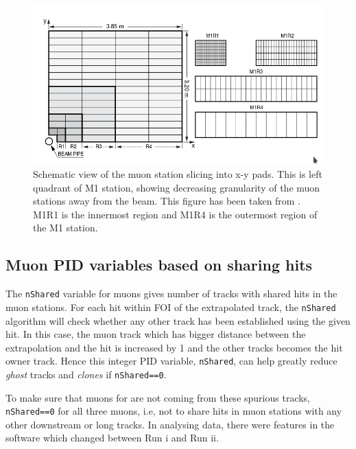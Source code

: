 \begin{figure}[!h]
        \centering
        \includegraphics[width = 1.0\textwidth]{figs/trimuon/pad.png}
        \caption{Schematic view of the muon station slicing into x-y pads. This is left quadrant of M1 station, showing decreasing granularity of the muon stations away from the beam. This figure has been taken from \cite{LHCb-DP-2012-002}. M1R1 is the innermost region and M1R4 is the outermost region of the M1 station. }
        \label{fig:pads}
\end{figure}

\subsection{Muon PID variables based on sharing hits}
\label{bugs}

The \texttt{nShared} variable for muons gives number of tracks with shared hits in the muon stations. For each hit within \gls{FOI} of the extrapolated track, the \texttt{nShared} algorithm will check whether any other track has been established using the given hit. In this case, the muon track which has bigger distance between the extrapolation and the hit is increased by 1 and the other tracks becomes the hit owner track. Hence this integer \gls{PID} variable, \texttt{nShared}, can help greatly reduce \textit{ghost} tracks and \textit{clones} if \texttt{nShared==0}.

To make sure that muons for \Bmumumu are not coming from these spurious tracks,  \texttt{nShared==0} for all three muons, i.e, not to share hits in muon stations with any other downstream or long tracks. In analysing data, there were features in the software which changed between Run \Rn{1} and Run \Rn{2}.

